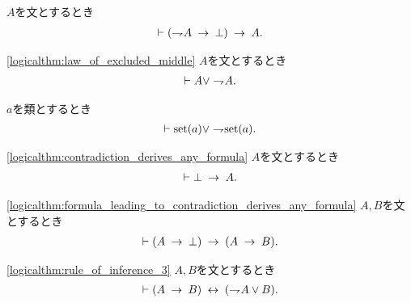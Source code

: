 	\begin{screen}
		\begin{logicalthm}[背理法の原理]
			$A$を文とするとき
			\begin{align}
				\vdash (\rightharpoondown\hspace{-0.25em} A \hspace{0.25em}\rightarrow\hspace{0.25em} \bot) \hspace{0.25em}\rightarrow\hspace{0.25em} A.
			\end{align}
		\end{logicalthm}
	\end{screen}
	
	\begin{screen}
		\begin{logicalthm}[排中律]\ref{logicalthm:law_of_excluded_middle}
			$A$を文とするとき
			\begin{align}
				\vdash A \vee \rightharpoondown\hspace{-0.25em} A.
			\end{align}
		\end{logicalthm}
	\end{screen}
	
	\begin{screen}
		\begin{thm}[類は集合であるか真類であるかのいずれかに定まる]
			$a$を類とするとき
			\begin{align}
				\vdash \operatorname*{set} (a) \vee \rightharpoondown\hspace{-0.25em} \operatorname*{set} (a).
			\end{align}
		\end{thm}
	\end{screen}
	
	\begin{screen}
		\begin{logicalthm}
		\ref{logicalthm:contradiction_derives_any_formula}
			$A$を文とするとき
			\begin{align}
				\vdash \bot \hspace{0.25em}\rightarrow\hspace{0.25em} A.
			\end{align}
		\end{logicalthm}
	\end{screen}
	
	\begin{screen}
		\begin{logicalthm}[矛盾を導く式はあらゆる式を導く]
		\ref{logicalthm:formula_leading_to_contradiction_derives_any_formula}
			$A,B$を文とするとき
			\begin{align}
				\vdash (A \hspace{0.25em}\rightarrow\hspace{0.25em} \bot) \hspace{0.25em}\rightarrow\hspace{0.25em} (A \hspace{0.25em}\rightarrow\hspace{0.25em} B).
			\end{align}
		\end{logicalthm}
	\end{screen}
	
	\begin{screen}
		\begin{logicalthm}[含意は否定と論理和で表せる]
		\ref{logicalthm:rule_of_inference_3}
			$A,B$を文とするとき
			\begin{align}
				\vdash (A \hspace{0.25em}\rightarrow\hspace{0.25em} B) \hspace{0.25em}\leftrightarrow\hspace{0.25em} (\rightharpoondown\hspace{-0.25em} A \vee B).
			\end{align}
		\end{logicalthm}
	\end{screen}
	
